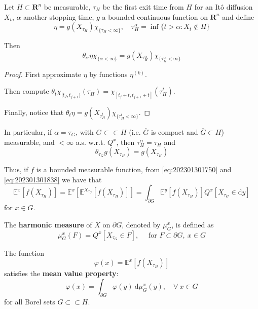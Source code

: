 \begin{theorem}
    Let $H \subset \mathbf{R}^n$ be measurable, $\tau_H$ be the first exit time from $H$ for an Itô diffusion $X_t$, $\alpha$ another stopping time, $g$ a bounded continuous function on $\mathbf{R}^n$ and define 
    \[
        \eta = g(X_{\tau_H}) \chi_{\{ \tau_H < \infty \}}, \quad \tau_H^\alpha = \inf \{ t > \alpha : X_t \notin H \}
    \]
    
    Then 
    \begin{equation*}
        \theta_\alpha \eta \chi_{\{ \alpha < \infty \}} = g(X_{\tau_H^\alpha}) \chi_{\{ \tau_H^\alpha < \infty\}}
    \end{equation*}
\end{theorem}

\begin{proof}
    First approximate $\eta$ by functions $\eta^{(k)}$.

    Then compute $\theta_t \chi_{[t_J, t_{j+1})}(\tau_H) = \chi_{[t_j+t, t_{j+1}+t]}(\tau_H^t)$. 

    Finally, notice that $\theta_t \eta = g(X_{\tau_H^t}) \chi_{\{ \tau_H^t < \infty \}}$.
\end{proof}

In particular, if $\alpha = \tau_G$, with $G \subset \subset H$ (i.e. $\overline{G}$ is compact and $\overline{G} \subset H$) measurable, and $ < \infty$ a.s. w.r.t. $Q^x$, then $\tau_H^\alpha = \tau_H$ and 
\begin{equation}\label{eq:202301301838}
    \theta_{\tau_G} g(X_{\tau_H}) = g(X_{\tau_H})
\end{equation}

Thus, if $f$ is a bounded measurable function, from \eqref{eq:202301301750} and \eqref{eq:202301301838} we have that 
\begin{equation*}
    \mathbb{E}^x [ f(X_{\tau_H}) ] = \mathbb{E}^x [\mathbb{E}^{X_{\tau_G}} [f(X_{\tau_H})]] = \int_{\partial G} \mathbb{E}^y [f(X_{\tau_H})] Q^x[X_{\tau_G} \in \mathrm{d}y]
\end{equation*}
for $x \in G$.

\begin{definition}
    The \textbf{harmonic measure} of $X$ on $\partial G$, denoted by $\mu_G^x$, is defined as 
    \[
        \mu_G^x(F) = Q^x[X_{\tau_G} \in F], \quad \text{ for } F \subset \partial G, ~x \in G
    \]
\end{definition}

The function 
\[
    \varphi(x) = \mathbb{E}^x [ f(X_{\tau_H})]
\]
satisfies the \textbf{mean value property}:
\begin{equation}
    \varphi(x) = \int_{\partial G} \varphi(y) ~\mathrm{d}\mu_G^x(y), \quad \forall~x \in G
\end{equation}
for all Borel sets $G \subset \subset H$.


